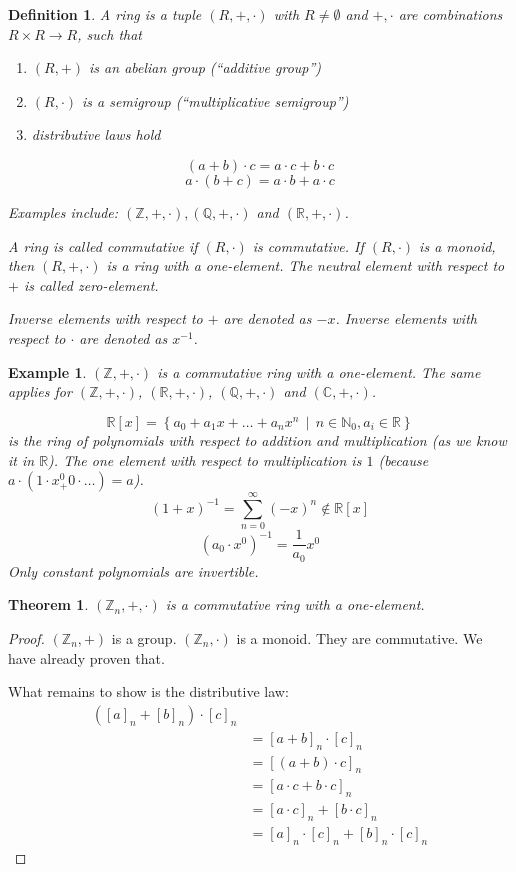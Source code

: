 \documentclass[a4paper,landscape,twocolumn]{article}
\newcommand\setdef[2]{\left\{#1\,\middle|\,#2\right\}}
\newtheorem{theorem}{Theorem}[section]
\newtheorem{defi}{Definition}[section]
\newtheorem{ex}{Example}[section]
\begin{document}
\begin{defi}
  A \emph{ring} is a tuple $(R, +, \cdot)$ with $R \neq \emptyset$ and
  $+, \cdot$ are combinations $R \times R \rightarrow R$, such that
  \begin{enumerate}
    \item $(R, +)$ is an abelian group (\enquote{additive group})
    \item $(R, \cdot)$ is a semigroup (\enquote{multiplicative semigroup})
    \item distributive laws hold
  \end{enumerate}
  \[ (a + b) \cdot c = a \cdot c + b \cdot c \]
  \[ a \cdot (b + c) = a \cdot b + a \cdot c \]

  Examples include: $(\mathbb Z, +, \cdot), (\mathbb Q, +, \cdot)$ and $(\mathbb R, +, \cdot)$.

  A ring is called \emph{commutative} if $(R, \cdot)$ is commutative.
  If $(R, \cdot)$ is a monoid, then $(R, +, \cdot)$ is a ring with a one-element.
  The neutral element with respect to $+$ is called zero-element.

  Inverse elements with respect to $+$ are denoted as $-x$.
  Inverse elements with respect to $\cdot$ are denoted as $x^{-1}$.
\end{defi}

\begin{ex}
  $(\mathbb Z, +, \cdot)$ is a commutative ring with a one-element.
  The same applies for $(\mathbb Z, +, \cdot)$, $(\mathbb R, +, \cdot)$, $(\mathbb Q, +, \cdot)$ and $(\mathbb C, +, \cdot)$.

  \[ \mathbb R[x] = \setdef{a_0 + a_1 x + \dots + a_n x^n}{n \in \mathbb N_0, a_i \in \mathbb R} \]
  is the ring of polynomials with respect to addition and multiplication (as we know it in $\mathbb R$).
  The one element with respect to multiplication is $1$ (because $a \cdot (1 \cdot x^0 _+ 0 \cdot \dots) = a$).
  \[ (1 + x)^{-1} = \sum_{n=0}^\infty (-x)^n \not\in \mathbb R[x] \]
  \[ (a_0 \cdot x^0)^{-1} = \frac1{a_0} x^0 \]
  Only constant polynomials are invertible.
\end{ex}

\begin{theorem}
  \label{satz-2-29}
  $(\mathbb Z_n, +, \cdot)$ is a commutative ring with a one-element.
\end{theorem}

\begin{proof}
  $(\mathbb Z_n, +)$ is a group.
  $(\mathbb Z_n, \cdot)$ is a monoid.
  They are commutative.
  We have already proven that.

  What remains to show is the distributive law:
  \begin{align*}
    ([a]_n + [b]_n) \cdot [c]_n \\
    &= [a + b]_n \cdot [c]_n \\
    &= [(a + b) \cdot c]_n \\
    &= [a\cdot c + b\cdot c]_n \\
    &= [a \cdot c]_n + [b \cdot c]_n \\
    &= [a]_n \cdot [c]_n + [b]_n \cdot [c]_n
  \end{align*}
\end{proof}
\end{document}
